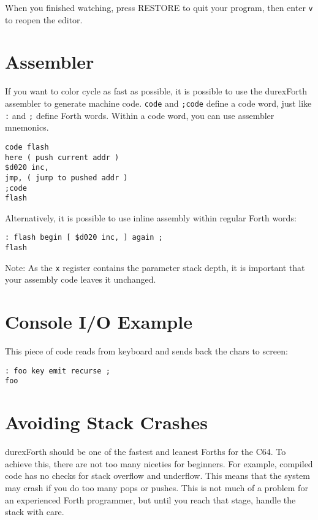 When you finished watching, press \textsc{RESTORE} to quit your program,
then enter \texttt{v} to reopen the editor.

\section{Assembler}

If you want to color cycle as fast as possible, it is possible to use the
durexForth assembler to generate machine code. \texttt{code} and
\texttt{;code} define a code word, just like \texttt{:} and \texttt{;}
define Forth words. Within a code word, you can use assembler mnemonics.

\begin{verbatim}
code flash
here ( push current addr )
$d020 inc,
jmp, ( jump to pushed addr )
;code
flash
\end{verbatim}

Alternatively, it is possible to use inline assembly within regular Forth words:

\begin{verbatim}
: flash begin [ $d020 inc, ] again ;
flash
\end{verbatim}

Note: As the \texttt{x} register contains the parameter stack depth, it is
important that your assembly code leaves it unchanged.

\section{Console I/O Example}

This piece of code reads from keyboard and sends back the chars to screen:

\begin{verbatim}
: foo key emit recurse ;
foo
\end{verbatim}

\section{Avoiding Stack Crashes}

durexForth should be one of the fastest and leanest Forths for the C64. To achieve this, there are
not too many niceties for beginners. For example, compiled code has no checks for stack overflow
and underflow. This means that the system may crash if you do too many pops or pushes. This is not
much of a problem for an experienced Forth programmer, but until you reach that stage, handle the
stack with care.

